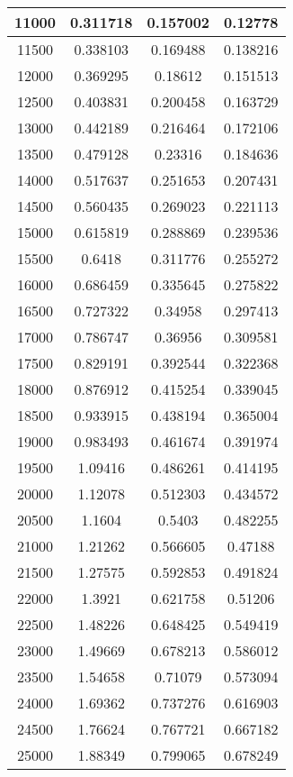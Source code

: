 \documentclass{article}
\begin{document}
\begin{longtable}{|c|c|c|c|}
			11000  &  0.311718	 &  0.157002	 &  0.12778  \\ \hline
			11500  &  0.338103	 &  0.169488	 &  0.138216  \\ \hline
			12000  &  0.369295	 &  0.18612	     &  0.151513  \\ \hline
			12500  &  0.403831	 &  0.200458	 &  0.163729  \\ \hline
			13000  &  0.442189	 &  0.216464	 &  0.172106  \\ \hline
			13500  &  0.479128	 &  0.23316	     &  0.184636  \\ \hline
			14000  &  0.517637	 &  0.251653	 &  0.207431  \\ \hline
			14500  &  0.560435	 &  0.269023	 &  0.221113  \\ \hline
			15000  &  0.615819	 &  0.288869	 &  0.239536  \\ \hline
			15500  &  0.6418	 &  0.311776	 &  0.255272  \\ \hline
			16000  &  0.686459	 &  0.335645	 &  0.275822  \\ \hline
			16500  &  0.727322	 &  0.34958	     &  0.297413  \\ \hline
			17000  &  0.786747	 &  0.36956	     &  0.309581  \\ \hline
			17500  &  0.829191	 &  0.392544	 &  0.322368  \\ \hline
			18000  &  0.876912	 &  0.415254	 &  0.339045  \\ \hline
			18500  &  0.933915	 &  0.438194	 &  0.365004  \\ \hline
			19000  &  0.983493	 &  0.461674	 &  0.391974  \\ \hline
			19500  &  1.09416	 &  0.486261	 &  0.414195  \\ \hline
			20000  &  1.12078	 &  0.512303	 &  0.434572  \\ \hline
			20500  &  1.1604	 &  0.5403	     &  0.482255  \\ \hline
			21000  &  1.21262	 &  0.566605	 &  0.47188  \\ \hline
			21500  &  1.27575	 &  0.592853	 &  0.491824  \\ \hline
			22000  &  1.3921	 &  0.621758	 &  0.51206  \\ \hline
			22500  &  1.48226	 &  0.648425	 &  0.549419  \\ \hline
			23000  &  1.49669	 &  0.678213	 &  0.586012  \\ \hline
			23500  &  1.54658	 &  0.71079      &	0.573094  \\ \hline
			24000  &  1.69362	 &  0.737276	 &  0.616903  \\ \hline
			24500  &  1.76624	 &  0.767721	 &  0.667182  \\ \hline
			25000  &  1.88349	 &  0.799065	 &  0.678249     \\ \hline
		\end{longtable}
\end{document}
